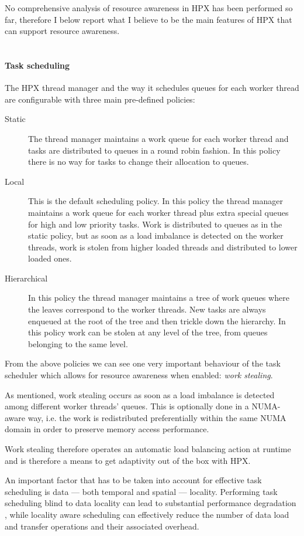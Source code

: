 No comprehensive analysis of resource awareness in HPX has been performed so far, therefore I below report what I believe to be the main features of HPX that can support resource awareness.
~\\~

\paragraph{Task scheduling}
The HPX thread manager and the way it schedules queues for each worker thread are configurable with three main pre-defined policies\cite{heller2017hpx,amatya2014parallel}:
\begin{description}
	\item [Static] The thread manager maintains a work queue for each worker thread and tasks are distributed to queues in a round robin fashion. In this policy there is no way for tasks to change their allocation to queues.
	\item [Local] This is the default scheduling policy. In this policy the thread manager maintains a work queue for each worker thread plus extra special queues for high and low priority tasks. Work is distributed to queues as in the static policy, but as soon as a load imbalance is detected on the worker threads, work is stolen from higher loaded threads and distributed to lower loaded ones.
	\item [Hierarchical] In this policy the thread manager maintains a tree of work queues where the leaves correspond to the worker threads. New tasks are always enqueued at the root of the tree and then trickle down the hierarchy. In this policy work can be stolen at any level of the tree, from queues belonging to the same level.
\end{description}

From the above policies we can see one very important behaviour of the task scheduler which allows for resource awareness when enabled: \emph{work stealing}.

As mentioned, work stealing occurs as soon as a load imbalance is detected among different worker threads' queues.
This is optionally done in a NUMA-aware way, i.e. the work is redistributed preferentially within the same NUMA domain in order to preserve memory access performance.

Work stealing therefore operates an automatic load balancing action at runtime and is therefore a means to get adaptivity out of the box with HPX.

An important factor that has to be taken into account for effective task scheduling is data --- both temporal and spatial --- locality. Performing task scheduling blind to data locality can lead to substantial performance degradation \cite{connelly1994workload}, while locality aware scheduling can effectively reduce the number of data load and transfer operations and their associated overhead.

